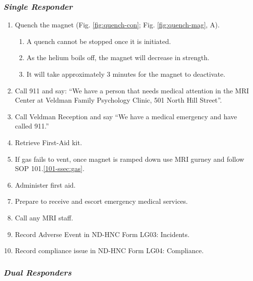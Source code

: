\documentclass[11pt]{article}
\begin{document}
\subsubsection*{\textit{Single Responder}}

\begin{enumerate}
	\item Quench the magnet (Fig. \ref{fig:quench-con}; Fig. \ref{fig:quench-mag}, A).
	\begin{enumerate}
		\item A quench cannot be stopped once it is initiated.
		\item As the helium boils off, the magnet will decrease in strength.
		\item It will take approximately 3 minutes for the magnet to deactivate.
	\end{enumerate}
	\item Call 911 and say: ``We have a person that needs medical attention in the MRI Center at Veldman Family Psychology Clinic, 501 North Hill Street''.
	\item Call Veldman Reception and say ``We have a medical emergency and have called 911.''
	\item Retrieve First-Aid kit.
	\item If gas fails to vent, once magnet is ramped down use MRI gurney and follow SOP 101.\ref{101-ssec:gas}.
	\item Administer first aid.
	\item Prepare to receive and escort emergency medical services.
	\item Call any MRI staff.
	\item Record Adverse Event in ND-HNC Form LG03: Incidents.
	\item Record compliance issue in ND-HNC Form LG04: Compliance.
\end{enumerate}

\subsubsection*{\textit{Dual Responders}}
\end{document}
